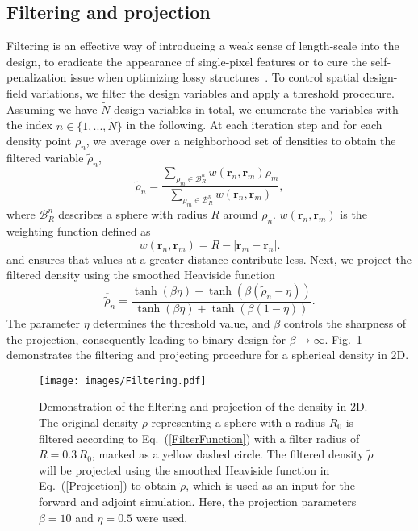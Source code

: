 \documentclass[aps,prl,twocolumn,superscriptaddress,longbibliography]{revtex4-1}
\begin{document}
\subsection{Filtering and projection}\label{Sec:FilterAndProjection}
Filtering is an effective way of introducing a weak sense
of length-scale into the design, to eradicate the appearance of single-pixel features \cite{BRUNS01Topology,Bourdin01Filters} or to cure the self-penalization issue when optimizing lossy structures~\cite{Hassan14Topology,Hassan2014patch,Aage17Topology}.
To control spatial design-field variations, we filter the design variables and apply a threshold procedure.  
Assuming we have $\tilde{N}$ design variables in total, we enumerate the variables with the index $n\in \{1,...,\tilde{N}\}$ in the following.  At each iteration step and for each density point $\rho_{n}$, we average over a neighborhood set of densities to obtain the filtered variable $\tilde{\rho}_n$,
\begin{equation}\label{FilterFunction}
\tilde{\rho}_n=\frac{\sum_{\rho_m \in \mathcal{B}^{n}_{R}} w\left(\mathbf{r}_n, \mathbf{r}_m\right)\rho_m}{\sum_{\rho_m  \in \mathcal{B}^{n}_{R}} w\left(\mathbf{r}_n, \mathbf{r}_m\right)},
\end{equation}
where $\mathcal{B}^{n}_{R}$ describes a sphere with radius $R$ around $\rho_n$. $w\left(\mathbf{r}_n, \mathbf{r}_m\right)$ is the weighting function defined as
\begin{equation}
w\left(\mathbf{r}_n, \mathbf{r}_m\right)=R-\left|\mathbf{r}_m-\mathbf{r}_n\right|.
\end{equation}
and ensures that values at a greater distance contribute less. Next, we project the filtered density using the smoothed Heaviside function
\begin{equation}\label{Projection}
\overline{\tilde{\rho}}_n=\frac{\tanh (\beta \eta)+\tanh \left(\beta\left(\tilde{\rho}_n-\eta\right)\right)}{\tanh (\beta \eta)+\tanh (\beta(1-\eta))}.
\end{equation}
The parameter $\eta$ determines the threshold value, and $\beta$ controls the sharpness of the projection, consequently leading  to binary design for $\beta \rightarrow \infty$. Fig.~\ref{Filtering} demonstrates the filtering and projecting procedure for a spherical density in 2D. 
\begin{figure}[t!]
\texttt{[image: images/Filtering.pdf]}
\caption{\label{Filtering} Demonstration of the filtering and projection of the density in 2D. The original density $\rho$ representing a sphere with a radius $R_0$ is filtered according to Eq.~(\ref{FilterFunction}) with a filter radius of $R=0.3\,R_0$, marked as a yellow dashed circle. The filtered density $\tilde{\rho}$ will be projected using the smoothed Heaviside function in Eq.~(\ref{Projection}) to obtain $\overline{\tilde{\rho}}$, which is used as an input for the forward and adjoint simulation. Here, the projection parameters $\beta=10$ and $\eta=0.5$ were used.}
\end{figure}
\end{document}

